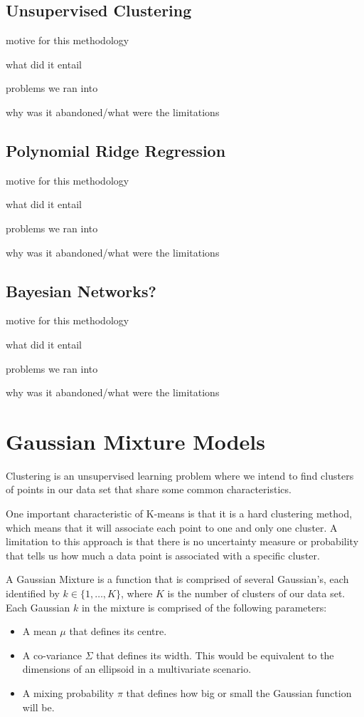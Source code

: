 \documentclass[fleqn,usenatbib]{mnras}
\begin{document}
\subsection{Unsupervised Clustering}
motive for this methodology

what did it entail

problems we ran into

why was it abandoned/what were the limitations
\subsection{Polynomial Ridge Regression}
motive for this methodology

what did it entail

problems we ran into

why was it abandoned/what were the limitations
\subsection{Bayesian Networks?}
motive for this methodology

what did it entail

problems we ran into

why was it abandoned/what were the limitations

\section{Gaussian Mixture Models}
Clustering is an unsupervised learning problem where we intend to find clusters of points in our data set that share some common characteristics.

One important characteristic of K-means is that it is a hard clustering method, which means that it will associate each point to one and only one cluster.
A limitation to this approach is that there is no uncertainty measure or probability that tells us how much a data point is associated with a specific cluster.

A Gaussian Mixture is a function that is comprised of several Gaussian's, each identified by $k \in \{1,\dots, K\}$, where $K$ is the number of clusters of our data set. Each Gaussian $k$ in the mixture is comprised of the following parameters:

\begin{itemize}
    \item A mean $\mu$ that defines its centre.
    \item A co-variance $\Sigma$ that defines its width. This would be equivalent to the dimensions of an ellipsoid in a multivariate scenario.
    \item A mixing probability $\pi$ that defines how big or small the Gaussian function will be.
\end{itemize}
\end{document}
